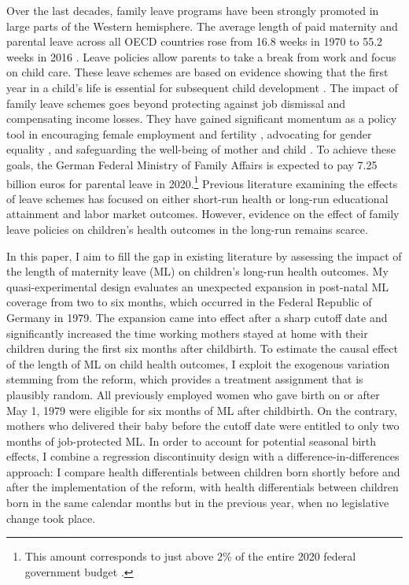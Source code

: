 

Over the last decades, family leave programs have been strongly promoted in large parts of the Western hemisphere. The average length of paid maternity and parental leave across all OECD countries rose from 16.8 weeks in 1970 to 55.2 weeks in 2016 \citep{oecd_data_leave}. Leave policies allow parents to take a break from work and focus on child care. These leave schemes are based on evidence showing that the first year in a child's life is essential for subsequent child development \citep{currie2011human}. The impact of family leave schemes goes beyond protecting against job dismissal and compensating income losses. They have gained significant momentum as a policy tool in encouraging female employment \citep{blau2013} and fertility \citep{RafaelLaliveandJosefZweimuller2009}, advocating for gender equality \citep{kotsadam2011state}, and safeguarding the well-being of mother and child \citep{butikofer2018impact}. To achieve these goals, the German Federal Ministry of Family Affairs is expected to pay 7.25 billion euros for parental leave in 2020.\footnote{This amount corresponds to just above 2\% of the entire 2020 federal government budget \citep{federal_budget}.} Previous literature examining the effects of leave schemes has focused on either short-run health or long-run educational attainment and labor market outcomes. However, evidence on the effect of family leave policies on children's health outcomes in the long-run remains scarce.


In this paper, I aim to fill the gap in existing literature by assessing the impact of the length of maternity leave (ML) on children’s long-run health outcomes. My quasi-experimental design evaluates an unexpected expansion in post-natal ML coverage from two to six months, which occurred in the Federal Republic of Germany in 1979. The expansion came into effect after a sharp cutoff date and significantly increased the time working mothers stayed at home with their children during the first six months after childbirth. To estimate the causal effect of the length of ML on child health outcomes, I exploit the exogenous variation stemming from the reform, which provides a treatment assignment that is plausibly random. All previously employed women who gave birth on or after May 1, 1979 were eligible for six months of ML after childbirth. On the contrary, mothers who delivered their baby before the cutoff date were entitled to only two months of job-protected ML. In order to account for potential seasonal birth effects, I combine a regression discontinuity design with a difference-in-differences approach: I compare health differentials between children born shortly before and after the implementation of the reform, with health differentials between children born in the same calendar months but in the previous year, when no legislative change took place.


